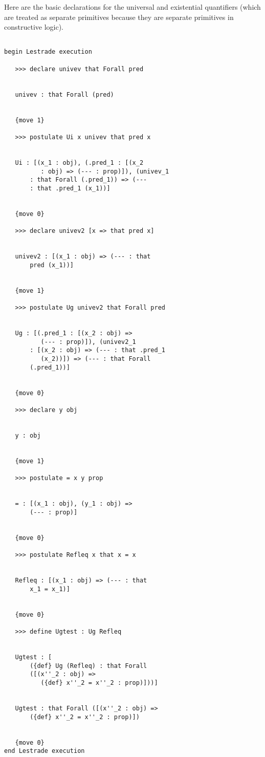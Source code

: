 \documentclass[12pt]{article}
\begin{document}
Here are the basic declarations for the universal and existential quantifiers (which are treated as separate primitives because they are separate
primitives in constructive logic).  

\begin{verbatim}

begin Lestrade execution

   >>> declare univev that Forall pred


   univev : that Forall (pred)


   {move 1}

   >>> postulate Ui x univev that pred x


   Ui : [(x_1 : obj), (.pred_1 : [(x_2 
          : obj) => (--- : prop)]), (univev_1 
       : that Forall (.pred_1)) => (--- 
       : that .pred_1 (x_1))]


   {move 0}

   >>> declare univev2 [x => that pred x]


   univev2 : [(x_1 : obj) => (--- : that 
       pred (x_1))]


   {move 1}

   >>> postulate Ug univev2 that Forall pred


   Ug : [(.pred_1 : [(x_2 : obj) => 
          (--- : prop)]), (univev2_1 
       : [(x_2 : obj) => (--- : that .pred_1 
          (x_2))]) => (--- : that Forall 
       (.pred_1))]


   {move 0}

   >>> declare y obj


   y : obj


   {move 1}

   >>> postulate = x y prop


   = : [(x_1 : obj), (y_1 : obj) => 
       (--- : prop)]


   {move 0}

   >>> postulate Refleq x that x = x


   Refleq : [(x_1 : obj) => (--- : that 
       x_1 = x_1)]


   {move 0}

   >>> define Ugtest : Ug Refleq


   Ugtest : [
       ({def} Ug (Refleq) : that Forall 
       ([(x''_2 : obj) => 
          ({def} x''_2 = x''_2 : prop)]))]


   Ugtest : that Forall ([(x''_2 : obj) => 
       ({def} x''_2 = x''_2 : prop)])


   {move 0}
end Lestrade execution
\end{verbatim}
\end{document}
